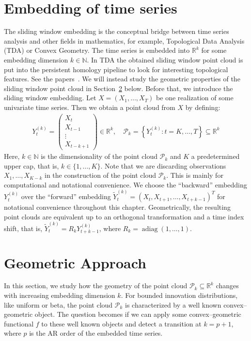 \section{Embedding of time series}

The sliding window embedding is the conceptual bridge between time series analysis and other fields in mathematics, for example, Topological Data Analysis (TDA) or Convex Geometry. The time series is embedded into $\mathbb{R}^k$ for some embedding dimension $k\in\mathbb{N}$. In TDA the obtained sliding window point cloud is put into the persistent homology pipeline to look for interesting topological features. See the papers~\cite{perea_sliding_2015}. We will instead study the geometric properties of the sliding window point cloud in Section~\ref{sec:geometric_approach} below. Before that, we introduce the sliding window embedding. Let $X=(X_1,\dots,X_T)$ be one realization of some univariate time series. Then we obtain a point cloud from $X$ by defining:
\begin{align*}
    Y_t^{(k)}=\begin{pmatrix}
        X_{t}\\
        X_{t-1}\\
        \vdots\\
        X_{t-k+1}
    \end{pmatrix}\in\mathbb{R}^k,\quad\mathcal{P}_{k}=\left\{Y_t^{(k)}:t=K,\dots,T\right\}\subseteq\mathbb{R}^k
\end{align*}
Here, $k\in\mathbb{N}$ is the dimensionality of the point cloud $\mathcal{P}_{k}$ and $K$ a predetermined upper cap, that is, $k\in\{1,\dots,K\}$. Note that we are discarding observations $X_1,\dots,X_{K-k}$ in the construction of the point cloud $\mathcal{P}_k$. This is mainly for computational and notational convenience. We choose the \enquote{backward} embedding $Y_t^{(k)}$ over the \enquote{forward} embedding $\tilde{Y}_t^{(k)}=(X_t,X_{t+1},\dots,X_{t+k-1})^{T}$ for notational convenience throughout this chapter. Geometrically, the resulting point clouds are equivalent up to an orthogonal transformation and a time index shift, that is, $\tilde{Y}_t^{(k)}=R_kY_{t+k-1}^{(k)}$, where $R_k=\operatorname{adiag}(1,\dots,1)$.

\section{Geometric Approach}\label{sec:geometric_approach}

In this section, we study how the geometry of the point cloud $\mathcal{P}_k\subseteq\mathbb{R}^{k}$ changes with increasing embedding dimension $k$. For bounded innovation distributions, like uniform or beta, the point cloud $\mathcal{P}_k$ is characterized by a well known convex--geometric object. The question becomes if we can apply some convex--geometric functional $f$ to these well known objects and detect a transition at $k=p+1$, where $p$ is the AR order of the embedded time series.


